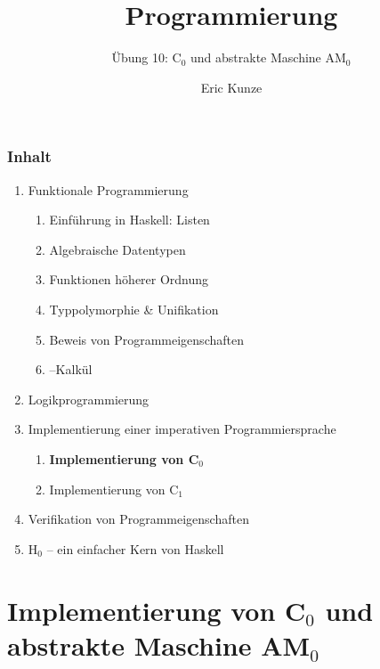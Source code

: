 \documentclass{beamer}
\begin{document}
	
	\title{Programmierung}
	\subtitle{Übung 10: C${}_\text{0}$ und abstrakte Maschine AM${}_\text{0}$}
	\author{Eric Kunze}
	\date{}
	
	\maketitle
	


\begin{frame}[fragile] \frametitle{Inhalt}
	\begin{enumerate}
		\item Funktionale Programmierung
		\begin{enumerate}
			\item Einführung in Haskell: Listen
			\item Algebraische Datentypen
			\item Funktionen höherer Ordnung
			\item Typpolymorphie \& Unifikation
			\item Beweis von Programmeigenschaften
			\item \textlambda--Kalkül
		\end{enumerate}
		\item Logikprogrammierung
		\item Implementierung einer imperativen Programmiersprache
		\begin{enumerate}
			\item \textbf{Implementierung von C${}_\text{0}$}
			\item Implementierung von C${}_\text{1}$
		\end{enumerate}
		\item Verifikation von Programmeigenschaften
		\item H${}_\text{0}$ -- ein einfacher Kern von Haskell
	\end{enumerate}
\end{frame}



\section{Implementierung von C${}_\text{0}$ und abstrakte Maschine AM${}_\text{0}$}
\end{document}
